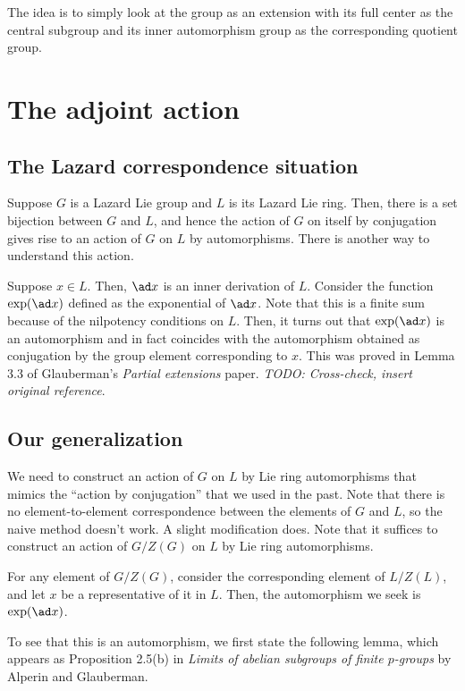 The idea is to simply look at the group as an extension with its full
center as the central subgroup and its inner automorphism group as the
corresponding quotient group.

\section{The adjoint action}

\subsection{The Lazard correspondence situation}

Suppose $G$ is a Lazard Lie group and $L$ is its Lazard Lie
ring. Then, there is a set bijection between $G$ and $L$, and hence
the action of $G$ on itself by conjugation gives rise to an action of
$G$ on $L$ by automorphisms. There is another way to understand this action.

Suppose $x \in L$. Then, $\ad x$ is an inner derivation of
$L$. Consider the function $\exp(\ad x)$ defined as the exponential of
$\ad x$. Note that this is a finite sum because of the nilpotency
conditions on $L$. Then, it turns out that $\exp(\ad x)$ is an
automorphism and in fact coincides with the automorphism obtained as
conjugation by the group element corresponding to $x$. This was proved
in Lemma 3.3 of Glauberman's {\em Partial extensions} paper. {\em
TODO: Cross-check, insert original reference}.

\subsection{Our generalization}

We need to construct an action of $G$ on $L$ by Lie ring automorphisms
that mimics the ``action by conjugation'' that we used in the
past. Note that there is no element-to-element correspondence between
the elements of $G$ and $L$, so the naive method doesn't work. A
slight modification does. Note that it suffices to construct an action
of $G/Z(G)$ on $L$ by Lie ring automorphisms.

For any element of $G/Z(G)$, consider the corresponding element of
$L/Z(L)$, and let $x$ be a representative of it in $L$. Then, the
automorphism we seek is $\exp(\ad x)$.

To see that this is an automorphism, we first state the following
lemma, which appears as Proposition 2.5(b) in {\em Limits of abelian
subgroups of finite $p$-groups} by Alperin and Glauberman.

